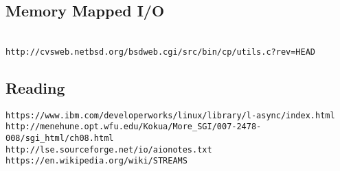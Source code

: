\documentclass[xga]{xdvislides}
\begin{document}
\subsection{Memory Mapped I/O}
\\
\vspace*{\fill}
\verb+http://cvsweb.netbsd.org/bsdweb.cgi/src/bin/cp/utils.c?rev=HEAD+
\vspace*{\fill}

\subsection{Reading}
\begin{verbatim}
https://www.ibm.com/developerworks/linux/library/l-async/index.html
http://menehune.opt.wfu.edu/Kokua/More_SGI/007-2478-008/sgi_html/ch08.html
http://lse.sourceforge.net/io/aionotes.txt
https://en.wikipedia.org/wiki/STREAMS
\end{verbatim}
\end{document}

